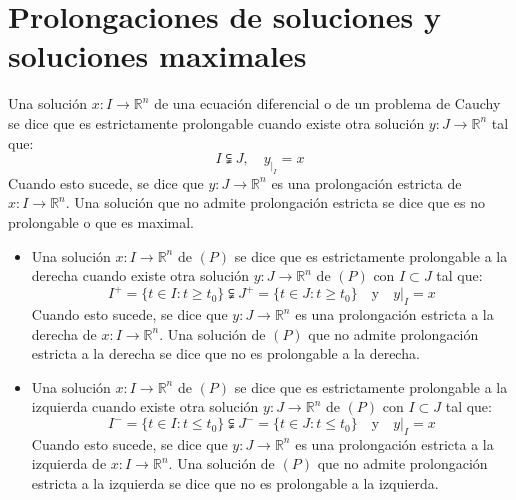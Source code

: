 \chapter{Prolongaciones de soluciones y soluciones maximales}
\begin{definition}
    Una solución $x: I \to \mathbb{R}^n$ de una ecuación diferencial o de un problema de Cauchy se dice que es estrictamente prolongable cuando existe otra solución $y: J \to \mathbb{R}^n$ tal que:
    $$I \subsetneqq J, \quad y_{|_I} = x$$
    Cuando esto sucede, se dice que $y: J \to \mathbb{R}^n$ es una prolongación estricta de $x: I \to \mathbb{R}^n$.
    Una solución que no admite prolongación estricta se dice que es no prolongable o que es maximal.
\end{definition}

\begin{definition}
    \hfill
    \begin{itemize}
        \item Una solución $x: I \to \mathbb{R}^n$ de $(P)$ se dice que es estrictamente prolongable a la derecha cuando existe otra solución $y: J \to \mathbb{R}^n$ de $(P)$ con $I \subset J$ tal que:
              $$I^+ = \{t \in I: t \geq t_0\} \subsetneqq J^+ = \{t \in J: t \geq t_0\} \quad \text{y} \quad y|_I = x$$
              Cuando esto sucede, se dice que $y: J \to \mathbb{R}^n$ es una prolongación estricta a la derecha de $x: I \to \mathbb{R}^n$.
              Una solución de $(P)$ que no admite prolongación estricta a la derecha se dice que no es prolongable a la derecha.
        \item Una solución $x: I \to \mathbb{R}^n$ de $(P)$ se dice que es estrictamente prolongable a la izquierda cuando existe otra solución $y: J \to \mathbb{R}^n$ de $(P)$ con $I \subset J$ tal que:
              $$I^- = \{t \in I: t \leq t_0\} \subsetneqq J^- = \{t \in J: t \leq t_0\} \quad \text{y} \quad y|_I = x$$
              Cuando esto sucede, se dice que $y: J \to \mathbb{R}^n$ es una prolongación estricta a la izquierda de $x: I \to \mathbb{R}^n$.
              Una solución de $(P)$ que no admite prolongación estricta a la izquierda se dice que no es prolongable a la izquierda.
    \end{itemize}
\end{definition}


